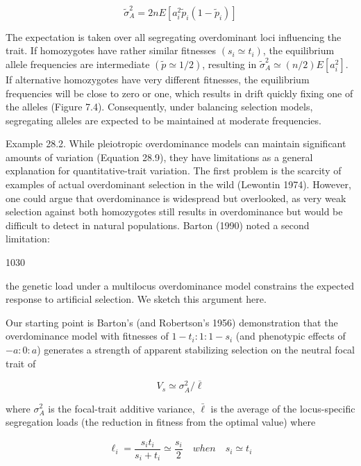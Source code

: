\documentclass{article}
\begin{document}
\begin{equation}
\widetilde{\sigma}_{A}^{2}=2n E[a_{i}^{2}\widetilde{p}_{i}\left(1-\widetilde{p}_{i}\right)]
\tag{28.9}
\label{eq:28_9}
\end{equation}

The expectation is taken over all segregating overdominant loci influencing the trait. If homozygotes have rather similar fitnesses  $ (s_i \simeq t_i) $, the equilibrium allele frequencies are intermediate  $ (\tilde{p} \simeq 1/2) $, resulting in  $ \tilde{\sigma}_A^2 \simeq (n/2)E[a_i^2] $. If alternative homozygotes have very different fitnesses, the equilibrium frequencies will be close to zero or one, which results in drift quickly fixing one of the alleles (Figure 7.4). Consequently, under balancing selection models, segregating alleles are expected to be maintained at moderate frequencies.

Example 28.2. While pleiotropic overdominance models can maintain significant amounts of variation (Equation 28.9), they have limitations as a general explanation for quantitative-trait variation. The first problem is the scarcity of examples of actual overdominant selection in the wild (Lewontin 1974). However, one could argue that overdominance is widespread but overlooked, as very weak selection against both homozygotes still results in overdominance but would be difficult to detect in natural populations. Barton (1990) noted a second limitation:

1030

the genetic load under a multilocus overdominance model constrains the expected response to artificial selection. We sketch this argument here.

Our starting point is Barton’s (and Robertson’s 1956) demonstration that the overdominance model with fitnesses of  $ 1 - t_i : 1 : 1 - s_i $ (and phenotypic effects of  $ -a : 0 : a $) generates a strength of apparent stabilizing selection on the neutral focal trait of

\begin{equation}
V_{s}\simeq\sigma_{A}^{2}/\overline{{\ell}}
\tag{28.10a}
\label{eq:28_10a}
\end{equation}

where  $ \sigma_A^2 $ is the focal-trait additive variance,  $ \bar{\ell} $ is the average of the locus-specific segregation loads (the reduction in fitness from the optimal value) where

\begin{equation}
\ell_{i}=\frac{s_{i}t_{i}}{s_{i}+t_{i}}\simeq\frac{s_{i}}{2}\quad when\quad s_{i}\simeq t_{i}
\tag{28.10b}
\label{eq:28_10b}
\end{equation}
\end{document}
